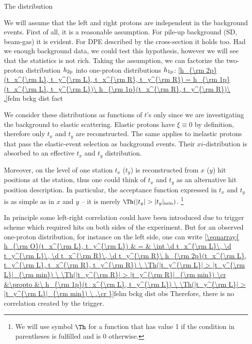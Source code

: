 
\caption{The distribution}

We will assume that the left and right protons are independent in the background events. First of all, it is a reasonable assumption. For pile-up background (SD, beam-gas) it is evident. For DPE described by the cross-section  it holds too. Had we enough background data, we could test this hypothesis, however we will see that the statistics is not rich. Taking the assumption, we can factorize the two-proton distribution $h_{\rm 2p}$ into one-proton distributions $h_{\rm 1p}$:
\eqref{h_{\rm 2p}(t_x^{\rm L}, t_y^{\rm L}, t_x^{\rm R}, t_y^{\rm R}) = h_{\rm 1p}(t_x^{\rm L}, t_y^{\rm L})\ h_{\rm 1p}(t_x^{\rm R}, t_y^{\rm R})\ .}{felm bckg dist fact}

We consider these distributions as functions of $t$'s only since we are investigating the background to elastic scattering. Elastic protons have $\xi\equiv 0$ by definition, therefore only $t_x$ and $t_y$ are reconstructed. The same applies to inelastic protons that pass the elastic-event selection as background events. Their $xi$-distribution is absorbed to an effective $t_x$ and $t_y$ distribution.

Moreover, on the level of one station $t_x$ ($t_y$) is reconstructed from $x$ ($y$) hit positions at the station, thus one could think of $t_x$ and $t_y$ as an alternative hit position description. In particular, the acceptance function expressed in $t_x$ and $t_y$ is as simple as in $x$ and $y$ -- it is merely $\Th(|t_y| > |t_y|_{\rm min})$. \footnote{%
We will use symbol $\Th$ for a function that has value 1 if the condition in parentheses is fulfilled and is 0 otherwise.
}

In principle some left-right correlation could have been introduced due to trigger scheme which required hits on both sides of the experiment. But for an observed one-proton distribution, for instance on the left side, one can write
\eqref{\eqnarray{
h_{\rm O}(t_x^{\rm L}, t_y^{\rm L}) & = &
\int \d t_x^{\rm L}\, \d t_y^{\rm L}\, \d t_x^{\rm R}\, \d t_y^{\rm R}\ h_{\rm 2p}(t_x^{\rm L}, t_y^{\rm L}, t_x^{\rm R}, t_y^{\rm R})
	\ \Th(|t_y^{\rm L}| > |t_y^{\rm L}|_{\rm min})
	\ \Th(|t_y^{\rm R}| > |t_y^{\rm R}|_{\rm min})
\cr
&\propto &\ h_{\rm 1p}(t_x^{\rm L}, t_y^{\rm L})
	\ \Th(|t_y^{\rm L}| > |t_y^{\rm L}|_{\rm min})
\ .\cr
}}{felm bckg dist obs}
Therefore, there is no correlation created by the trigger.

